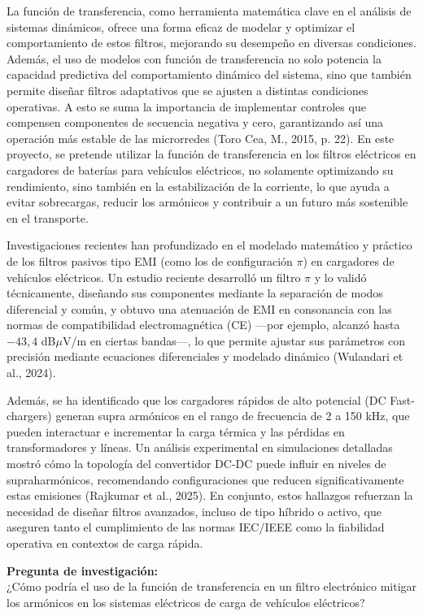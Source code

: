 La función de transferencia, como herramienta matemática clave en el análisis de sistemas dinámicos, ofrece una forma eficaz de modelar y optimizar el comportamiento de estos filtros, mejorando su desempeño en diversas condiciones. Además, el uso de modelos con función de transferencia no solo potencia la capacidad predictiva del comportamiento dinámico del sistema, sino que también permite diseñar filtros adaptativos que se ajusten a distintas condiciones operativas. A esto se suma la importancia de implementar controles que compensen componentes de secuencia negativa y cero, garantizando así una operación más estable de las microrredes (Toro Cea, M., 2015, p. 22). En este proyecto, se pretende utilizar la función de transferencia en los filtros eléctricos en cargadores de baterías para vehículos eléctricos, no solamente optimizando su rendimiento, sino también en la estabilización de la corriente, lo que ayuda a evitar sobrecargas, reducir los armónicos y contribuir a un futuro más sostenible en el transporte.

Investigaciones recientes han profundizado en el modelado matemático y práctico de los filtros
pasivos tipo EMI (como los de configuración $\pi$) en cargadores de vehículos eléctricos. Un estudio
reciente desarrolló un filtro $\pi$ y lo validó técnicamente, diseñando sus componentes mediante la
separación de modos diferencial y común, y obtuvo una atenuación de EMI en consonancia con las
normas de compatibilidad electromagnética (CE) ---por ejemplo, alcanzó hasta $-43,4$ dB$\mu$V/m en
ciertas bandas---, lo que permite ajustar sus parámetros con precisión mediante ecuaciones
diferenciales y modelado dinámico (Wulandari et al., 2024).

Además, se ha identificado que los cargadores rápidos de alto potencial (DC Fast-chargers) generan
supra armónicos en el rango de frecuencia de 2 a 150 kHz, que pueden interactuar e incrementar la
carga térmica y las pérdidas en transformadores y líneas. Un análisis experimental en simulaciones
detalladas mostró cómo la topología del convertidor DC-DC puede influir en niveles de
supraharmónicos, recomendando configuraciones que reducen significativamente estas emisiones
(Rajkumar et al., 2025). En conjunto, estos hallazgos refuerzan la necesidad de diseñar filtros
avanzados, incluso de tipo híbrido o activo, que aseguren tanto el cumplimiento de las normas
IEC/IEEE como la fiabilidad operativa en contextos de carga rápida.

\vspace{1cm}
\noindent\textbf{Pregunta de investigación:} \\
¿Cómo podría el uso de la función de transferencia en un filtro electrónico mitigar los armónicos en los sistemas eléctricos de carga de vehículos eléctricos?
